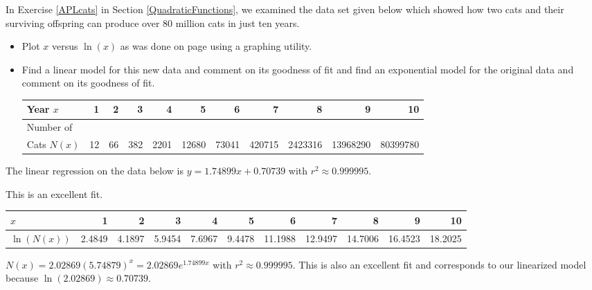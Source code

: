 \documentclass{ximera}
\begin{document}
\begin{problem}\label{APLcatsrevisited}
     In Exercise \ref{APLcats} in Section \ref{QuadraticFunctions}, we examined the data set given below which showed how two cats and their surviving offspring can produce over 80 million cats in just ten years. 

\begin{itemize}
    \item 
     Plot $x$ versus $\ln(x)$ as was done on page \pageref{swineflulinearized} using a graphing utility. 

\item 
    Find a linear model for this new data and comment on its goodness of fit and  find an exponential model for the original data and comment on its goodness of fit.

\begin{tabular}{|l|r|r|r|r|r|r|r|r|r|r|} \hline
Year $x$ & 1 & 2 & 3 & 4 & 5 & 6 & 7 & 8 & 9 & 10 \\ 
\hline 
Number of  & & & & & & & & & & \\
Cats $N(x)$ & 12 & 66 & 382 & 2201 & 12680 & 73041 & 420715 & 2423316 & 13968290 & 80399780 \\ \hline
\end{tabular}

\end{itemize}

\begin{solution}
The linear regression on the data below is $y = 1.74899x + 0.70739$ with $r^{2} \approx 0.999995$.  

This is an excellent fit.

\scriptsize

\noindent \begin{tabular}{|l|r|r|r|r|r|r|r|r|r|r|} \hline
$x$ & 1 & 2 & 3 & 4 & 5 & 6 & 7 & 8 & 9 & 10 \\ 
\hline 
$\ln(N(x))$ & 2.4849 & 4.1897 & 5.9454 & 7.6967 & 9.4478 & 11.1988 & 12.9497 & 14.7006 & 16.4523 & 18.2025 \\ \hline
\end{tabular}

\normalsize

$N(x) = 2.02869(5.74879)^{x} = 2.02869e^{1.74899x}$ with $r^{2} \approx 0.999995$.  This is also an excellent fit and corresponds to our linearized model because $\ln(2.02869) \approx 0.70739$.
\end{solution}

\end{problem}
\end{document}
